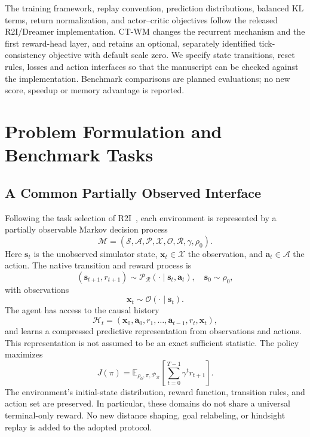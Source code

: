 \documentclass{article}
\begin{document}
The training framework, replay convention, prediction distributions, balanced KL terms, return normalization, and actor--critic objectives follow the released R2I/Dreamer implementation. CT-WM changes the recurrent mechanism and the first reward-head layer, and retains an optional, separately identified tick-consistency objective with default scale zero. We specify state transitions, reset rules, losses and action interfaces so that the manuscript can be checked against the implementation. Benchmark comparisons are planned evaluations; no new score, speedup or memory advantage is reported.

\section{Problem Formulation and Benchmark Tasks}

\subsection{A Common Partially Observed Interface}

Following the task selection of R2I~\cite{samsami2024mastering}, each environment is represented by a partially observable Markov decision process
\begin{equation}
\mathcal M=(\mathcal S,\mathcal A,\mathcal P,\mathcal X,\mathcal O,\mathcal R,\gamma,\rho_0).
\label{eq:benchmark_pomdp}
\end{equation}
Here $\mathbf s_t$ is the unobserved simulator state, $\mathbf x_t\in\mathcal X$ the observation, and $\mathbf a_t\in\mathcal A$ the action. The native transition and reward process is
\begin{equation}
(\mathbf s_{t+1},r_{t+1})\sim\mathcal P_{\mathcal R}
(\cdot\mid\mathbf s_t,\mathbf a_t),\quad\mathbf s_0\sim\rho_0,
\label{eq:benchmark_transition}
\end{equation}
with observations
\begin{equation}
\mathbf x_t\sim\mathcal O(\cdot\mid\mathbf s_t).
\label{eq:benchmark_observation}
\end{equation}
The agent has access to the causal history
\begin{equation}
\mathcal H_t=(\mathbf x_0,\mathbf a_0,r_1,\ldots,\mathbf a_{t-1},r_t,\mathbf x_t),
\label{eq:benchmark_history}
\end{equation}
and learns a compressed predictive representation from observations and actions. This representation is not assumed to be an exact sufficient statistic. The policy maximizes
\begin{equation}
J(\pi)=\mathbb E_{\rho_0,\pi,\mathcal P_{\mathcal R}}
\left[\sum_{t=0}^{T-1}\gamma^t r_{t+1}\right].
\label{eq:benchmark_return}
\end{equation}
The environment's initial-state distribution, reward function, transition rules, and action set are preserved. In particular, these domains do not share a universal terminal-only reward. No new distance shaping, goal relabeling, or hindsight replay is added to the adopted protocol.
\end{document}
